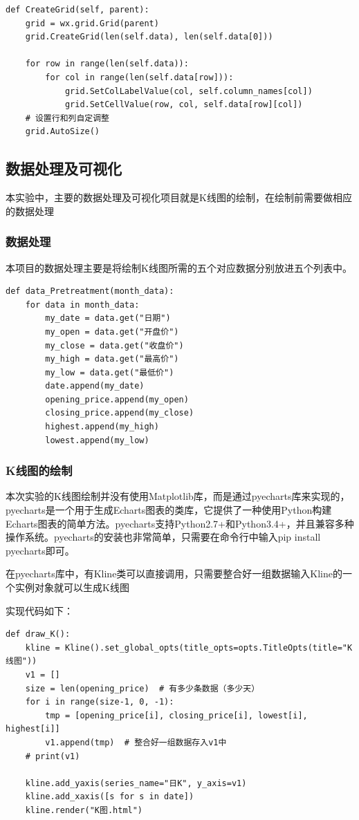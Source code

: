 \documentclass[UTF8,12pt]{article}
\begin{document}
\begin{lstlisting}[title=grid构建,frame=shadowbox]
def CreateGrid(self, parent):
    grid = wx.grid.Grid(parent)
    grid.CreateGrid(len(self.data), len(self.data[0]))

    for row in range(len(self.data)):
        for col in range(len(self.data[row])):
            grid.SetColLabelValue(col, self.column_names[col])
            grid.SetCellValue(row, col, self.data[row][col])
    # 设置行和列自定调整
    grid.AutoSize()
\end{lstlisting}

\subsection{数据处理及可视化}
本实验中，主要的数据处理及可视化项目就是K线图的绘制，在绘制前需要做相应的数据处理

\subsubsection{数据处理}
本项目的数据处理主要是将绘制K线图所需的五个对应数据分别放进五个列表中。

\begin{lstlisting}[title=数据处理,title=shadowbox]
def data_Pretreatment(month_data):
    for data in month_data:
        my_date = data.get("日期")
        my_open = data.get("开盘价")
        my_close = data.get("收盘价")
        my_high = data.get("最高价")
        my_low = data.get("最低价")
        date.append(my_date)
        opening_price.append(my_open)
        closing_price.append(my_close)
        highest.append(my_high)
        lowest.append(my_low)
\end{lstlisting}

\subsubsection{K线图的绘制}
本次实验的K线图绘制并没有使用Matplotlib库，而是通过pyecharts库来实现的，pyecharts是一个用于生成Echarts图表的类库，它提供了一种使用Python构建Echarts图表的简单方法。pyecharts支持Python2.7+和Python3.4+，并且兼容多种操作系统。pyecharts的安装也非常简单，只需要在命令行中输入pip install pyecharts即可。

在pyecharts库中，有Kline类可以直接调用，只需要整合好一组数据输入Kline的一个实例对象就可以生成K线图

实现代码如下：
\begin{lstlisting}[title=K线图绘制,frame=shadowbox]
def draw_K():
    kline = Kline().set_global_opts(title_opts=opts.TitleOpts(title="K线图"))
    v1 = []
    size = len(opening_price)  # 有多少条数据（多少天）
    for i in range(size-1, 0, -1):
        tmp = [opening_price[i], closing_price[i], lowest[i], highest[i]]
        v1.append(tmp)  # 整合好一组数据存入v1中
    # print(v1)

    kline.add_yaxis(series_name="日K", y_axis=v1)
    kline.add_xaxis([s for s in date])
    kline.render("K图.html")
\end{lstlisting}
\end{document}
